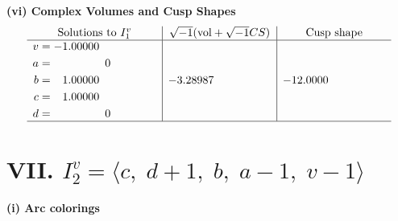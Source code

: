 \documentclass[1p]{elsarticle_modified}
\theoremstyle{definition}
\newcommand{\I}{\sqrt{-1}}
\begin{document}
\newpage\flushleft \textbf{(vi) Complex Volumes and Cusp Shapes}
$$\begin{array}{c|c|c}  
\text{Solutions to }I^v_{1}& \I (\text{vol} + \sqrt{-1}CS) & \text{Cusp shape}\\
 \hline 
\begin{aligned}
v &= -1.00000\phantom{ +0.000000I} \\
a &= \phantom{-0.000000 } 0 \\
b &= \phantom{-}1.00000\phantom{ +0.000000I} \\
c &= \phantom{-}1.00000\phantom{ +0.000000I} \\
d &= \phantom{-0.000000 } 0\end{aligned}
 & -3.28987\phantom{ +0.000000I} & -12.0000\phantom{ +0.000000I}\\
 \hline 
 \end{array}$$\newpage\newpage\renewcommand{\arraystretch}{1}
\centering \section*{VII. $I^v_{2}= \langle c,\;d+1,\;b,\;a-1,\;v-1 \rangle$}
\flushleft \textbf{(i) Arc colorings}\\
\end{document}
